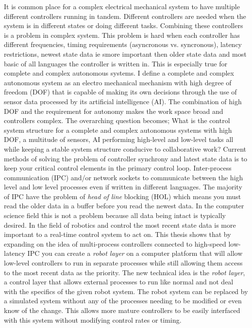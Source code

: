 It is common place for a complex electrical mechanical system to have multiple different controllers running in tandem.  
Different controllers are needed when the system is in different states or doing different tasks.
Combining these controllers is a problem in complex system.
This problem is hard when each controller has different frequencies, timing requirements (asyncronous vs. syncronous), latency restrictions, newest state data ie smore important then older state data and most basic of all languages the controller is written in.
This is especially true for complete and complex autonomous systems.
I define a complete and complex autonomous system as an electro mechanical mechanism with high degree of freedom (DOF) that is capable of making its own decisions through the use of sensor data processed by its artificial intelligence (AI).
The combination of high DOF and the requirement for autonomy makes the work space broad and controllers complex.
The overarching question becomes; What is the control system structure for a complete and complex autonomous systems with high DOF, a multitude of sensors, AI performing high-level and low-level tasks all while keeping a stable system structure conducive to collaborative work?
Current methods of solving the problem of controller synchrony and latest state data is to keep your critical control elements in the primary control loop.
Inter-process communication (IPC) and/or network sockets to communicate between the high level and low level processes even if written in different languages.
The majority of IPC have the problem of \textit{head of line} blocking (HOL) which means you must read the older data in a buffer before you read the newest data.
In the computer science field this is not a problem because all data being intact is typically desired.  
In the field of robotics and control the most recent state data is more important to a real-time control system to act on.
This thesis shows that by expanding on the idea of multi-process controllers connected to high-speed low-latency IPC you can create a \textit{robot layer} on a computer platform that will allow low-level controllers to run in separate processes while still allowing them access to the most recent data as the priority.
The new technical idea is the \textit{robot layer}, a control layer that allows external processes to run like normal and not deal with the specifics of the given robot system.
The robot system can be replaced by a simulated system without any of the processes needing to be modified or even know of the change.
This allows more mature controllers to be easily interfaced with this system without modifying control rates or timing.
